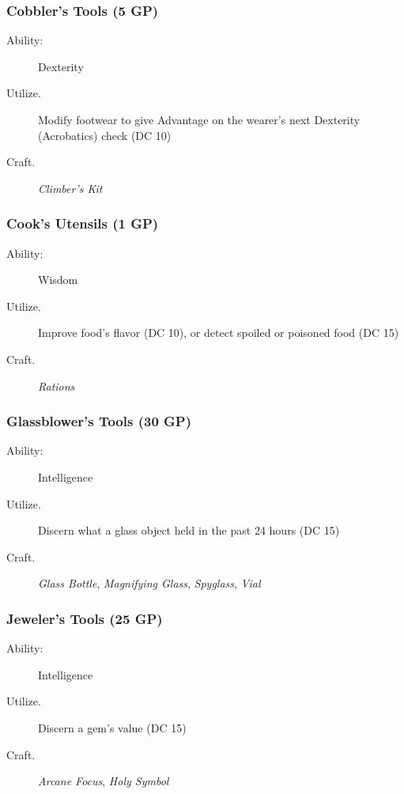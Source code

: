\documentclass[10pt,a4paper,twoside,bg=print,twocolumn,openany,nodeprecatedcode]{dndbook}
\begin{document}
\subsubsection{Cobbler's Tools (5 GP)}

\begin{description}
\item[Ability:]
Dexterity
\item[Utilize.]
Modify footwear to give Advantage on the wearer's next Dexterity (Acrobatics) check (DC 10)
\item[Craft.]
\textit{Climber's Kit}
\end{description}

\subsubsection{Cook's Utensils (1 GP)}

\begin{description}
\item[Ability:]
Wisdom
\item[Utilize.]
Improve food's flavor (DC 10), or detect spoiled or poisoned food (DC 15)
\item[Craft.]
\textit{Rations}
\end{description}

\subsubsection{Glassblower's Tools (30 GP)}

\begin{description}
\item[Ability:]
Intelligence
\item[Utilize.]
Discern what a glass object held in the past 24 hours (DC 15)
\item[Craft.]
\textit{Glass Bottle}, \textit{Magnifying Glass}, \textit{Spyglass}, \textit{Vial}
\end{description}

\subsubsection{Jeweler's Tools (25 GP)}

\begin{description}
\item[Ability:]
Intelligence
\item[Utilize.]
Discern a gem's value (DC 15)
\item[Craft.]
\textit{Arcane Focus}, \textit{Holy Symbol}
\end{description}
\end{document}
